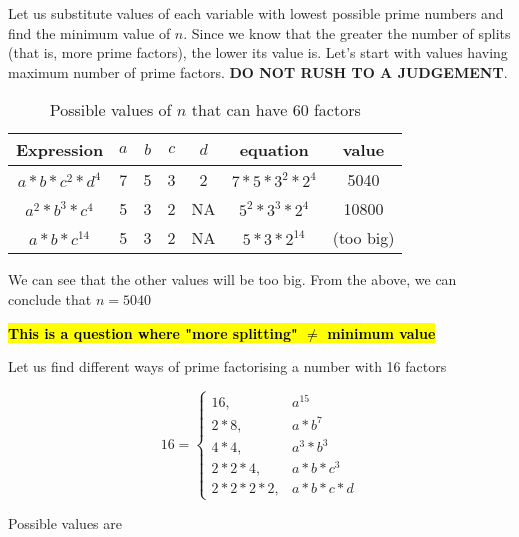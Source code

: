 Let us substitute values of each variable with lowest possible prime numbers and find the minimum value of $n$. Since we know that the greater the number of splits (that is, more prime factors), the lower its value is. Let's start with values having maximum number of prime factors. \textbf{DO NOT RUSH TO A JUDGEMENT}. 

\begin{table}[h!]
    \centering
    \begin{tabular}{|| c | c | c | c | c | c | c ||}
        \hline
         Expression & $a$ & $b$ & $c$ & $d$ & equation & value  \\
        \hline
        $a * b * c^2 * d^4$ & 7 & 5 & 3 & 2 & $7 * 5 * 3^2 * 2^4$ & 5040 \\
        \hline
        $a^2 * b^3 * c^4$ & 5 & 3 & 2 & NA & $5^2 * 3^3 * 2^4$ & 10800 \\
        \hline
        $a * b * c^{14}$ & 5 & 3 & 2 & NA & $5 * 3 * 2^{14}$ & (too big) \\
        \hline
    \end{tabular}
    \caption{Possible values of $n$ that can have 60 factors}
\end{table}

We can see that the other values will be too big. From the above, we can conclude that $n = 5040$


\hl{\textbf{This is a question where "more splitting" $\neq$ minimum value}}

Let us find different ways of prime factorising a number with 16 factors

\begin{equation*}
    16 = 
    \begin{cases}
        16, & a^{15} \\
        2 * 8, & a * b^7 \\
        4 * 4, & a^3 * b^3 \\
        2 * 2 * 4, & a * b * c^3 \\
        2 * 2 * 2 * 2, & a * b * c * d
    \end{cases}
\end{equation*}

Possible values are

